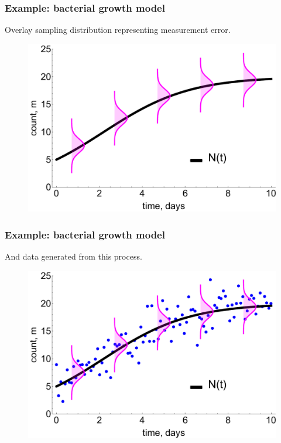 \documentclass[handout]{beamer}
\begin{document}
\begin{frame}
	\frametitle{Example: bacterial growth model}
	Overlay sampling distribution representing measurement error.
	
	\begin{figure}[ht]
		\centerline{\includegraphics[width=1\textwidth]{./Figures/lec7_odeSingleBulding2.pdf}}
	\end{figure}
	
\end{frame}

\begin{frame}
	\frametitle{Example: bacterial growth model}
	And data generated from this process.
	
	\begin{figure}[ht]
		\centerline{\includegraphics[width=1\textwidth]{./Figures/lec7_odeSingleBulding3.pdf}}
	\end{figure}
	
\end{frame}
\end{document}
